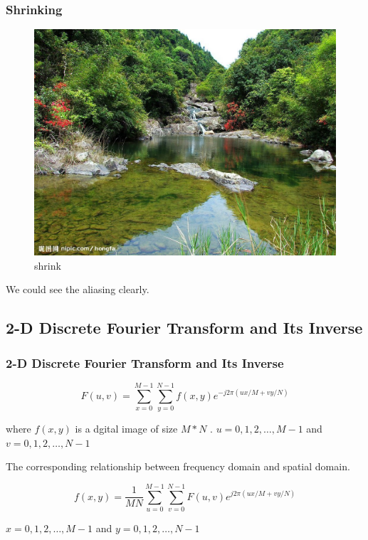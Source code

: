 \documentclass[notheorems, serif, table, compress]{beamer}  %
\begin{document}
\begin{frame}
\frametitle{Shrinking}
 \begin{figure}
 \caption{shrink}
 \includegraphics[width=0.7\linewidth]{suoxiao.png}
 \end{figure}
We could see the aliasing clearly.%
\end{frame}



\subsection{2-D Discrete Fourier Transform and Its Inverse}%
\begin{frame}
\frametitle{2-D Discrete Fourier Transform and Its Inverse}
    
\begin{equation} \label{3}
F(u,v)=\sum_{x=0}^{M-1}\sum_{y=0}^{N-1}f(x,y)e^{-j2\pi(ux/M+vy/N)}
\end{equation}

where $f(x,y)$ is a dgital image of size $M*N$ . $u=0,1,2,\ldots,M-1$ and $v=0,1,2,\ldots,N-1$

The corresponding relationship between frequency domain and spatial domain.%

\begin{equation} \label{4}
f(x,y)=\frac{1}{MN}\sum_{u=0}^{M-1}\sum_{v=0}^{N-1}F(u,v)e^{j2\pi(ux/M+vy/N)}
\end{equation}

$x=0,1,2,\ldots,M-1$ and $y=0,1,2,\ldots,N-1$

\end{frame}
\end{document}

